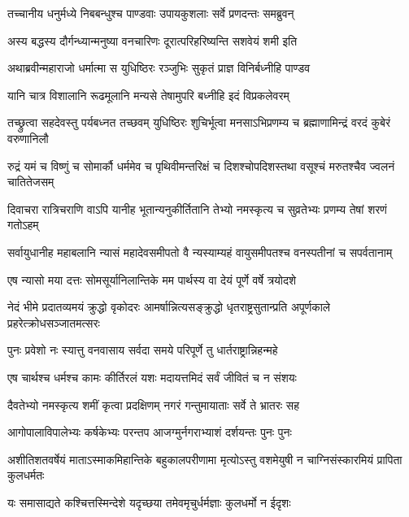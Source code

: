 \twolineshloka
{तच्चानीय धनुर्मध्ये निबबन्धुश्च पाण्डवाः}
{उपायकुशलाः सर्वे प्रणदन्तः समब्रुवन्}


\twolineshloka
{अस्य बद्धस्य दौर्गन्ध्यान्मनुष्या वनचारिणः}
{दूरात्परिहरिष्यन्ति सशवेयं शमी इति}


\twolineshloka
{अथाब्रवीन्महाराजो धर्मात्मा स युधिष्ठिरः}
{रञ्जुभिः सुकृतं प्राज्ञ विनिर्बध्नीहि पाण्डव}


\twolineshloka
{यानि चात्र विशालानि रूढमूलानि मन्यसे}
{तेषामुपरि बध्नीहि इदं विप्रकलेवरम्}



\onelineshloka
{तच्छ्रुत्वा सहदेवस्तु पर्यबध्नत तच्छवम्}
\twolineshloka
{युधिष्ठिरः शुचिर्भूत्वा मनसाऽभिप्रणम्य च}
{ब्रह्माणामिन्द्रं वरदं कुबेरं वरुणानिलौ}


\threelineshloka
{रुद्रं यमं च विष्णुं च सोमार्कौ धर्ममेव च}
{पृथिवीमन्तरिक्षं च दिशश्चोपदिशस्तथा}
{वसूश्चं मरुतश्चैव ज्वलनं चातितेजसम्}


\fourlineindentedshloka
{दिवाचरा रात्रिचराणि वाऽपि}
{यानीह भूतान्यनुकीर्तितानि}
{तेभ्यो नमस्कृत्य च सुव्रतेभ्यः}
{प्रणम्य तेषां शरणं गतोऽहम्}


\fourlineindentedshloka
{सर्वायुधानीह महाबलानि}
{न्यासं महादेवसमीपतो वै}
{न्यस्याम्यहं वायुसमीपतश्च}
{वनस्पतीनां च सपर्वतानाम्}


\twolineshloka
{एष न्यासो मया दत्तः सोमसूर्यानिलान्तिके}
{मम पार्थस्य वा देयं पूर्णे वर्षे त्रयोदशे}


\threelineshloka
{नेदं भीमे प्रदातव्यमयं क्रुद्धो वृकोदरः}
{आमर्षान्नित्यसङ्क्रुद्धो धृतराष्ट्रसुतान्प्रति}
{अपूर्णकाले प्रहरेत्क्रोधसञ्जातमत्सरः}


\twolineshloka
{पुनः प्रवेशो नः स्यात्तु वनवासाय सर्वदा}
{समये परिपूर्णे तु धार्तराष्ट्रान्निहन्महे}


\twolineshloka
{एष चार्थश्च धर्मश्च कामः कीर्तिरलं यशः}
{मदायत्तमिदं सर्वं जीवितं च न संशयः}



\twolineshloka
{दैवतेभ्यो नमस्कृत्य शमीं कृत्वा प्रदक्षिणम्}
{नगरं गन्तुमायाताः सर्वे ते भ्रातरः सह}


\twolineshloka
{आगोपालाविपालेभ्यः कर्षकेभ्यः परन्तप}
{आजग्मुर्नगराभ्याशं दर्शयन्तः पुनः पुनः}


\threelineshloka
{अशीतिशतवर्षेयं माताऽस्माकमिहान्तिके}
{बहुकालपरीणामा मृत्योऽस्तु वशमेयुषी}
{न चाग्निसंस्कारमियं प्रापिता कुलधर्मतः}


\twolineshloka
{यः समासाद्यते कश्चित्तस्मिन्देशे यदृच्छया}
{तमेवमृचुर्धर्मज्ञाः कुलधर्मो न ईदृशः}


